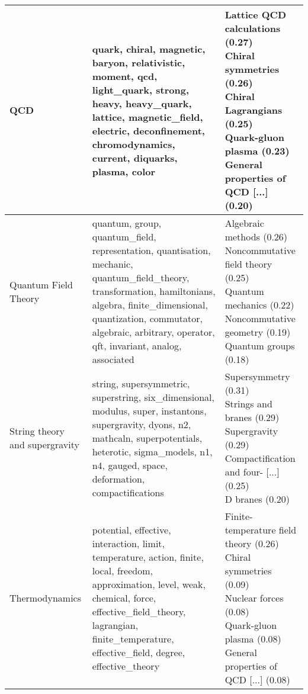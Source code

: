 \begin{longtable}{p{}|b{}|b{}}
                           QCD &                                               quark, chiral, magnetic, baryon, relativistic, moment, qcd, light\_quark, strong, heavy, heavy\_quark, lattice, magnetic\_field, electric, deconfinement, chromodynamics, current, diquarks, plasma, color &                                                                            \shortstack[l]{Lattice QCD calculations (0.27)\\ Chiral symmetries (0.26)\\ Chiral Lagrangians (0.25)\\ Quark-gluon plasma (0.23)\\ General properties of QCD [...] (0.20)}\\ \hline
          Quantum Field Theory & quantum, group, quantum\_field, representation, quantisation, mechanic, quantum\_field\_theory, transformation, hamiltonians, algebra, finite\_dimensional, quantization, commutator, algebraic, arbitrary, operator, qft, invariant, analog, associated &                                                                                      \shortstack[l]{Algebraic methods (0.26)\\ Noncommutative field theory (0.25)\\ Quantum mechanics (0.22)\\ Noncommutative geometry (0.19)\\ Quantum groups (0.18)}\\ \hline
String theory and supergravity &                                   string, supersymmetric, superstring, six\_dimensional, modulus, super, instantons, supergravity, dyons, n2, mathcaln, superpotentials, heterotic, sigma\_models, n1, n4, gauged, space, deformation, compactifications &                                                                                                     \shortstack[l]{Supersymmetry (0.31)\\ Strings and branes (0.29)\\ Supergravity (0.29)\\ Compactification and four- [...] (0.25)\\ D branes (0.20)}\\ \hline
                Thermodynamics &               potential, effective, interaction, limit, temperature, action, finite, local, freedom, approximation, level, weak, chemical, force, effective\_field\_theory, lagrangian, finite\_temperature, effective\_field, degree, effective\_theory &                                                                         \shortstack[l]{Finite-temperature field theory (0.26)\\ Chiral symmetries (0.09)\\ Nuclear forces (0.08)\\ Quark-gluon plasma (0.08)\\ General properties of QCD [...] (0.08)}\\ \hline

\end{longtable}
